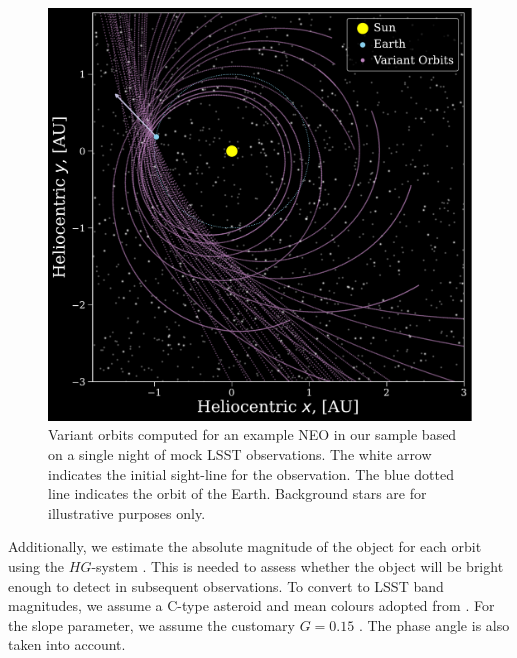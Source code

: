 \documentclass[twocolumn]{aastex631}
\begin{document}
\begin{figure}[htb]
    \centering
    \includegraphics[width=\columnwidth]{figures/orbits_example_small.pdf}
    \caption{Variant orbits computed for an example NEO in our sample based on a single night of mock LSST observations. The white arrow indicates the initial sight-line for the observation. The blue dotted line indicates the orbit of the Earth. Background stars are for illustrative purposes only.}
    \label{fig:orbits}
\end{figure}


Additionally, we estimate the absolute magnitude of the object for each orbit using the $HG$-system \citep{mpc_h_g}. This is needed to assess whether the object will be bright enough to detect in subsequent observations. To convert to LSST band magnitudes, we assume a C-type asteroid and mean colours adopted from \citep{Jones+2018}. For the slope parameter, we assume the customary $G=0.15$ \citep{mpc_h_g}. The phase angle is also taken into account.
\end{document}
